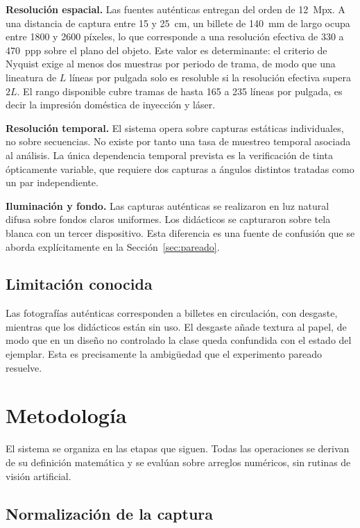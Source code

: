 \documentclass[conference]{IEEEtran}
\begin{document}
\textbf{Resolución espacial.} Las fuentes auténticas entregan del orden
de 12~Mpx. A una distancia de captura entre 15 y 25~cm, un billete de
140~mm de largo ocupa entre 1800 y 2600 píxeles, lo que corresponde a
una resolución efectiva de 330 a 470~ppp sobre el plano del objeto.
Este valor es determinante: el criterio de Nyquist exige al menos dos
muestras por periodo de trama, de modo que una lineatura de $L$ líneas
por pulgada solo es resoluble si la resolución efectiva supera $2L$. El
rango disponible cubre tramas de hasta 165 a 235 líneas por pulgada, es
decir la impresión doméstica de inyección y láser.

\textbf{Resolución temporal.} El sistema opera sobre capturas estáticas
individuales, no sobre secuencias. No existe por tanto una tasa de
muestreo temporal asociada al análisis. La única dependencia temporal
prevista es la verificación de tinta ópticamente variable, que requiere
dos capturas a ángulos distintos tratadas como un par independiente.

\textbf{Iluminación y fondo.} Las capturas auténticas se realizaron en
luz natural difusa sobre fondos claros uniformes. Los didácticos se
capturaron sobre tela blanca con un tercer dispositivo. Esta diferencia
es una fuente de confusión que se aborda explícitamente en la
Sección~\ref{sec:pareado}.

\subsection{Limitación conocida}

Las fotografías auténticas corresponden a billetes en circulación, con
desgaste, mientras que los didácticos están sin uso. El desgaste añade
textura al papel, de modo que en un diseño no controlado la clase queda
confundida con el estado del ejemplar. Esta es precisamente la
ambigüedad que el experimento pareado resuelve.

\section{Metodología}

El sistema se organiza en las etapas que siguen. Todas las operaciones
se derivan de su definición matemática y se evalúan sobre arreglos
numéricos, sin rutinas de visión artificial.

\subsection{Normalización de la captura}
\end{document}
